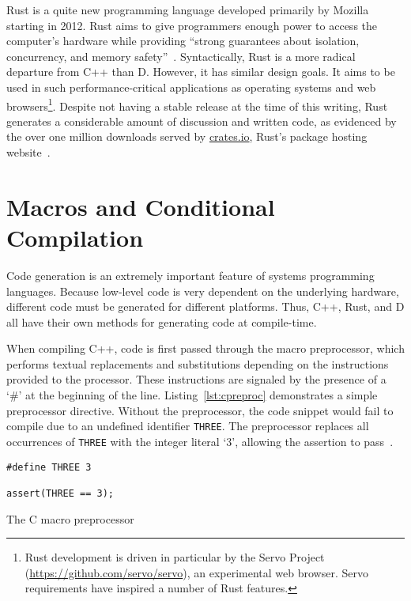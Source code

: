 \documentclass[finalcopy]{srpaper}
\begin{document}
Rust is a quite new programming language developed primarily by Mozilla
starting in 2012. Rust aims to give programmers enough power to access the
computer's hardware while providing ``strong guarantees about isolation,
concurrency, and memory safety''~\cite{Matsakis:2014:RL:2663171.2663188}.
Syntactically, Rust is a more radical departure from C++ than D. However, it
has similar design goals. It aims to be used in such performance-critical
applications as operating systems and web browsers\footnote{Rust development is
driven in particular by the Servo Project
(\url{https://github.com/servo/servo}), an experimental web browser. Servo
requirements have inspired a number of Rust features.}. Despite
not having a stable release at the time of this writing, Rust generates a
considerable amount of discussion and written code, as evidenced by the over
one million downloads served by \url{crates.io}, Rust's package hosting
website~\cite{Cratesio}.

\section{Macros and Conditional Compilation}

Code generation is an extremely important feature of systems programming
languages. Because low-level code is very dependent on the underlying
hardware, different code must be generated for different platforms. Thus, C++,
Rust, and D all have their own methods for generating code at compile-time.

When compiling C++, code is first passed through the macro preprocessor, which
performs textual replacements and substitutions depending on the instructions
provided to the processor. These instructions are signaled by the presence of a
`\#' at the beginning of the line. Listing~\ref{lst:cpreproc} demonstrates a
simple preprocessor directive. Without the preprocessor, the code snippet would
fail to compile due to an undefined identifier \texttt{THREE}. The preprocessor
replaces all occurrences of \texttt{THREE} with the integer literal `3',
allowing the assertion to pass~\cite{CppReference}.

\begin{listing}[H]
\begin{verbatim}
#define THREE 3

assert(THREE == 3);
\end{verbatim}
\caption{The C macro preprocessor}
\label{lst:cpreproc}
\end{listing}
\end{document}
